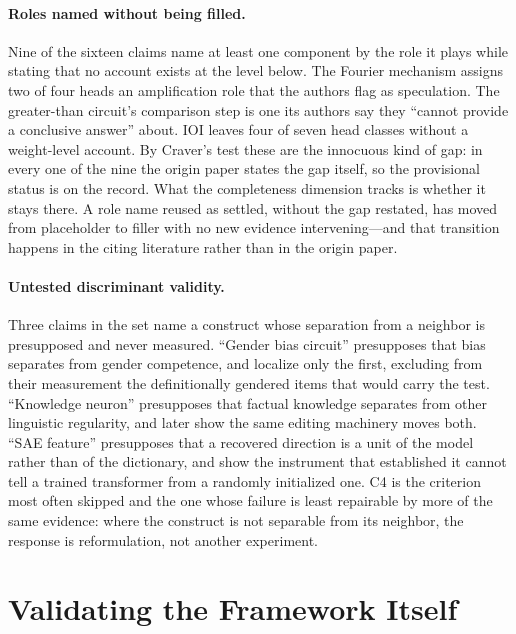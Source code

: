 \documentclass{article}
\begin{document}
\paragraph{Roles named without being filled.} Nine of the sixteen claims name at least one component by the role it plays while stating that no account exists at the level below. The Fourier mechanism assigns two of four heads an amplification role that the authors flag as speculation. The greater-than circuit's comparison step is one its authors say they ``cannot provide a conclusive answer'' about. IOI leaves four of seven head classes without a weight-level account. By Craver's test these are the innocuous kind of gap: in every one of the nine the origin paper states the gap itself, so the provisional status is on the record. What the completeness dimension tracks is whether it stays there. A role name reused as settled, without the gap restated, has moved from placeholder to filler with no new evidence intervening---and that transition happens in the citing literature rather than in the origin paper.

\paragraph{Untested discriminant validity.} Three claims in the set name a construct whose separation from a neighbor is presupposed and never measured. ``Gender bias circuit'' presupposes that bias separates from gender competence, and \citet{vig2020gender} localize only the first, excluding from their measurement the definitionally gendered items that would carry the test. ``Knowledge neuron'' presupposes that factual knowledge separates from other linguistic regularity, and \citet{niu2024knowledge} later show the same editing machinery moves both. ``SAE feature'' presupposes that a recovered direction is a unit of the model rather than of the dictionary, and \citet{heap2025sparse} show the instrument that established it cannot tell a trained transformer from a randomly initialized one. C4 is the criterion most often skipped and the one whose failure is least repairable by more of the same evidence: where the construct is not separable from its neighbor, the response is reformulation, not another experiment.

\section{Validating the Framework Itself}
\label{sec:self-validation}
\end{document}
